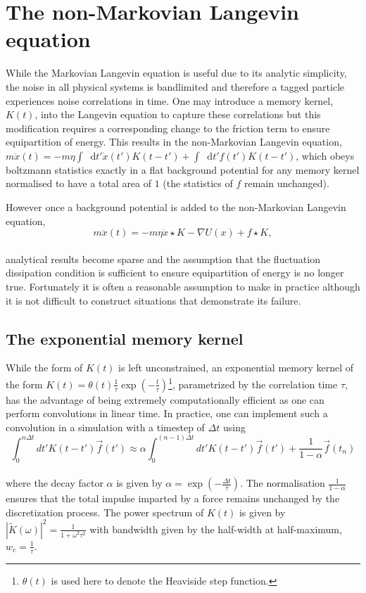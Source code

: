 \documentclass{article}
\newcommand*{\diff}{\mathop{}\!\mathrm{d}}
\begin{document}
\section{The non-Markovian Langevin equation}

While the Markovian Langevin equation is useful due to its analytic simplicity, the noise in all physical systems is bandlimited and therefore a tagged particle experiences noise correlations in time. One may introduce a memory kernel, $K(t)$, into the Langevin equation to capture these correlations but this modification requires a corresponding change to the friction term to ensure equipartition of energy. This results in the non-Markovian Langevin equation, $m\ddot{x}(t)=-m\eta\int\diff{t'}\dot{x}(t')K(t-t') + \int\diff{t'}f(t')K(t-t')$, which obeys boltzmann statistics exactly in a flat background potential for any memory kernel normalised to have a total area of $1$ (the statistics of $f$ remain unchanged). 

However once a background potential is added to the non-Markovian Langevin equation,
\\
\begin{equation}
	\label{eq:gle}
	m\ddot{x}(t)=-m\eta\dot{x} \star K - \nabla U(x) + f \star K,
\end{equation}
\\
analytical results become sparse and the assumption that the fluctuation dissipation condition is sufficient to ensure equipartition of energy is no longer true. Fortunately it is often a reasonable assumption to make in practice although it is not difficult to construct situations that demonstrate its failure.

\subsection{The exponential memory kernel}

While the form of $K(t)$ is left unconstrained, an exponential memory kernel of the form $K(t)=\theta(t)\frac{1}{\tau}\exp\left(-\frac{t}{\tau}\right)$\footnote{$\theta(t)$ is used here to denote the Heaviside step function.}, parametrized by the correlation time $\tau$, has the advantage of being extremely computationally efficient as one can perform convolutions in linear time. In practice, one can implement such a convolution in a simulation with a timestep of $\Delta{t}$ using
\\
$$
\int_0^{n\Delta{t}} dt' K\left(t-t'\right) \vec{f}(t') \approx \alpha \int_0^{(n-1)\Delta{t}} dt' K\left(t-t'\right) \vec{f}(t') + \frac{1}{1-\alpha} \vec{f}\left(t_n\right)
$$
\\
where the decay factor $\alpha$ is given by $\alpha=\exp(-\frac{\Delta{t}}{\tau})$. The normalisation $\frac{1}{1-\alpha}$ ensures that the total impulse imparted by a force remains unchanged by the discretization process. The power spectrum of $K(t)$ is given by $\left|\tilde{K}(\omega)\right|^2 = \frac{1}{1+\omega^2\tau^2}$ with bandwidth given by the half-width at half-maximum, $w_c=\frac{1}{\tau}$.
\end{document}
